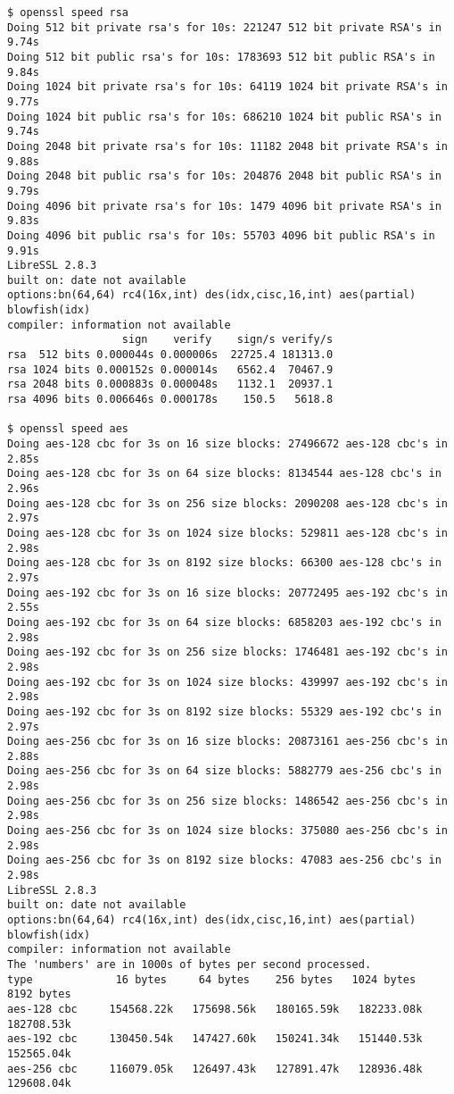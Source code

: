 \documentclass[11pt]{article}
\begin{document}
\begin{small}
\begin{verbatim}
$ openssl speed rsa
Doing 512 bit private rsa's for 10s: 221247 512 bit private RSA's in 9.74s
Doing 512 bit public rsa's for 10s: 1783693 512 bit public RSA's in 9.84s
Doing 1024 bit private rsa's for 10s: 64119 1024 bit private RSA's in 9.77s
Doing 1024 bit public rsa's for 10s: 686210 1024 bit public RSA's in 9.74s
Doing 2048 bit private rsa's for 10s: 11182 2048 bit private RSA's in 9.88s
Doing 2048 bit public rsa's for 10s: 204876 2048 bit public RSA's in 9.79s
Doing 4096 bit private rsa's for 10s: 1479 4096 bit private RSA's in 9.83s
Doing 4096 bit public rsa's for 10s: 55703 4096 bit public RSA's in 9.91s
LibreSSL 2.8.3
built on: date not available
options:bn(64,64) rc4(16x,int) des(idx,cisc,16,int) aes(partial) blowfish(idx)
compiler: information not available
                  sign    verify    sign/s verify/s
rsa  512 bits 0.000044s 0.000006s  22725.4 181313.0
rsa 1024 bits 0.000152s 0.000014s   6562.4  70467.9
rsa 2048 bits 0.000883s 0.000048s   1132.1  20937.1
rsa 4096 bits 0.006646s 0.000178s    150.5   5618.8

$ openssl speed aes
Doing aes-128 cbc for 3s on 16 size blocks: 27496672 aes-128 cbc's in 2.85s
Doing aes-128 cbc for 3s on 64 size blocks: 8134544 aes-128 cbc's in 2.96s
Doing aes-128 cbc for 3s on 256 size blocks: 2090208 aes-128 cbc's in 2.97s
Doing aes-128 cbc for 3s on 1024 size blocks: 529811 aes-128 cbc's in 2.98s
Doing aes-128 cbc for 3s on 8192 size blocks: 66300 aes-128 cbc's in 2.97s
Doing aes-192 cbc for 3s on 16 size blocks: 20772495 aes-192 cbc's in 2.55s
Doing aes-192 cbc for 3s on 64 size blocks: 6858203 aes-192 cbc's in 2.98s
Doing aes-192 cbc for 3s on 256 size blocks: 1746481 aes-192 cbc's in 2.98s
Doing aes-192 cbc for 3s on 1024 size blocks: 439997 aes-192 cbc's in 2.98s
Doing aes-192 cbc for 3s on 8192 size blocks: 55329 aes-192 cbc's in 2.97s
Doing aes-256 cbc for 3s on 16 size blocks: 20873161 aes-256 cbc's in 2.88s
Doing aes-256 cbc for 3s on 64 size blocks: 5882779 aes-256 cbc's in 2.98s
Doing aes-256 cbc for 3s on 256 size blocks: 1486542 aes-256 cbc's in 2.98s
Doing aes-256 cbc for 3s on 1024 size blocks: 375080 aes-256 cbc's in 2.98s
Doing aes-256 cbc for 3s on 8192 size blocks: 47083 aes-256 cbc's in 2.98s
LibreSSL 2.8.3
built on: date not available
options:bn(64,64) rc4(16x,int) des(idx,cisc,16,int) aes(partial) blowfish(idx)
compiler: information not available
The 'numbers' are in 1000s of bytes per second processed.
type             16 bytes     64 bytes    256 bytes   1024 bytes   8192 bytes
aes-128 cbc     154568.22k   175698.56k   180165.59k   182233.08k   182708.53k
aes-192 cbc     130450.54k   147427.60k   150241.34k   151440.53k   152565.04k
aes-256 cbc     116079.05k   126497.43k   127891.47k   128936.48k   129608.04k
\end{verbatim}
\end{small}
\end{document}
